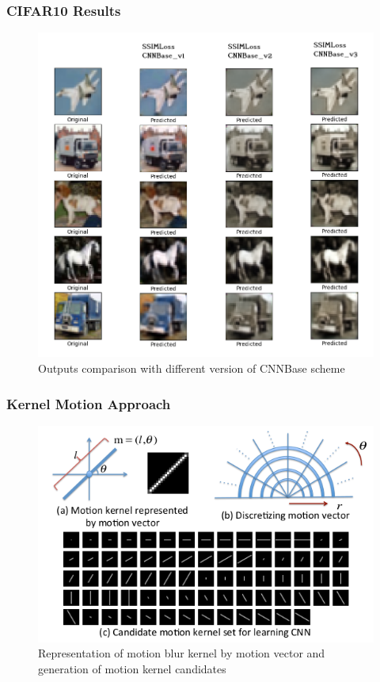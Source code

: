 \documentclass [handout] {beamer}
\begin{document}
\begin{frame}
	\frametitle{CIFAR10 Results}
	\begin{figure}[hptb]
	\centering
	\includegraphics[scale=0.32]{../CNNBase_comparison.png}
	\caption{Outputs comparison with different version of CNNBase scheme}
	\label{CNNBase_comparison}
	\end{figure}
\end{frame}

\begin{frame}
	\frametitle{Kernel Motion Approach}
	\begin{figure}[hptb]
	\centering
	\includegraphics[scale=0.7]{../motion_kernel.png} 
	\caption{Representation of motion blur kernel by motion vector
	and generation of motion kernel candidates}
	\label{motion_kernel}
	\end{figure}
\end{frame}
\end{document}
